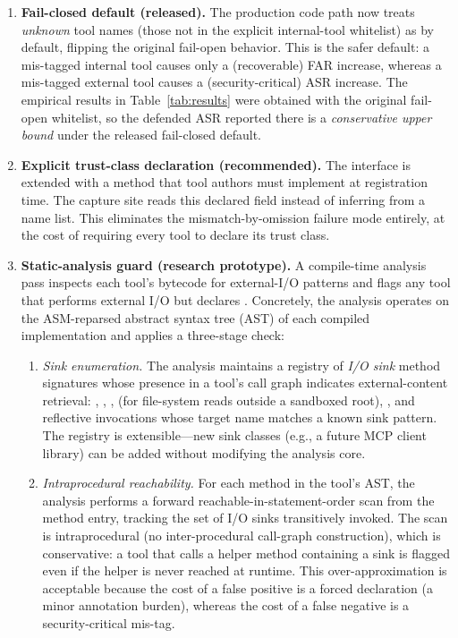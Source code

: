 \begin{enumerate}[leftmargin=*]
    \item \textbf{Fail-closed default (released).} The production code path now treats \emph{unknown} tool names (those not in the explicit internal-tool whitelist) as  by default, flipping the original fail-open behavior. This is the safer default: a mis-tagged internal tool causes only a (recoverable) FAR increase, whereas a mis-tagged external tool causes a (security-critical) ASR increase. The empirical results in Table~\ref{tab:results} were obtained with the original fail-open whitelist, so the defended ASR reported there is a \emph{conservative upper bound} under the released fail-closed default.
    \item \textbf{Explicit trust-class declaration (recommended).} The  interface is extended with a  method that tool authors must implement at registration time. The capture site reads this declared field instead of inferring from a name list. This eliminates the mismatch-by-omission failure mode entirely, at the cost of requiring every tool to declare its trust class.
    \item \textbf{Static-analysis guard (research prototype).} A compile-time analysis pass inspects each tool's bytecode for external-I/O patterns and flags any tool that performs external I/O but declares . Concretely, the analysis operates on the ASM-reparsed abstract syntax tree (AST) of each compiled  implementation and applies a three-stage check:
    \begin{enumerate}[leftmargin=*,label=(\alph*)]
        \item \emph{Sink enumeration.} The analysis maintains a registry of \emph{I/O sink} method signatures whose presence in a tool's call graph indicates external-content retrieval: , , ,  (for file-system reads outside a sandboxed root), , and reflective invocations  whose target name matches a known sink pattern. The registry is extensible---new sink classes (e.g., a future MCP client library) can be added without modifying the analysis core.
        \item \emph{Intraprocedural reachability.} For each method in the tool's AST, the analysis performs a forward reachable-in-statement-order scan from the method entry, tracking the set of I/O sinks transitively invoked. The scan is intraprocedural (no inter-procedural call-graph construction), which is conservative: a tool that calls a helper method containing a sink is flagged even if the helper is never reached at runtime. This over-approximation is acceptable because the cost of a false positive is a forced  declaration (a minor annotation burden), whereas the cost of a false negative is a security-critical mis-tag.

\end{enumerate}
\end{enumerate}
